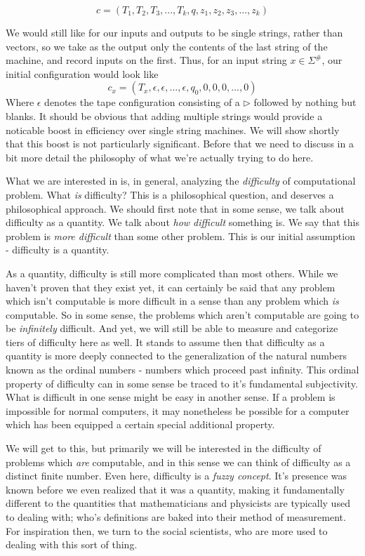 \documentclass{article}
\theoremstyle{definition}
\theoremstyle{plain}
\theoremstyle{theorem}
\begin{document}
\[c=(T_1,T_2,T_3,...,T_k,q,z_1,z_2,z_3,...,z_k) \]
\par We would still like for our inputs and outputs to be single strings, rather than vectors, so we take as the output only the contents of the last string of the machine, and record inputs on the first. Thus, for an input string $x\in \Sigma^\#$, our initial configuration would look like
\[c_x=(T_x,\epsilon, \epsilon,...,\epsilon,q_0,0,0,0,...,0) \]
Where $\epsilon$ denotes the tape configuration consisting of a $\triangleright$ followed by nothing but blanks. It should be obvious that adding multiple strings would provide a noticable boost in efficiency over single string machines. We will show shortly that this boost is not particularly significant. Before that we need to discuss in a bit more detail the philosophy of what we're actually trying to do here. 
\par What we are interested in is, in general, analyzing the \textit{difficulty} of computational problem. What \textit{is} difficulty? This is a philosophical question, and deserves a philosophical approach. We should first note that in some sense, we talk about difficulty as a quantity. We talk about \textit{how difficult} something is. We say that this problem is \textit{more difficult} than some other problem. This is our initial assumption - difficulty is a quantity.
\par As a quantity, difficulty is still more complicated than most others. While we haven't proven that they exist yet, it can certainly be said that any problem which isn't computable is more difficult in a sense than any problem which \textit{is} computable. So in some sense, the problems which aren't computable are going to be \textit{infinitely} difficult. And yet, we will still be able to measure and categorize tiers of difficulty here as well. It stands to assume then that difficulty as a quantity is more deeply connected to the generalization of the natural numbers known as the ordinal numbers - numbers which proceed past infinity. This ordinal property of difficulty can in some sense be traced to it's fundamental subjectivity. What is difficult in one sense might be easy in another sense. If a problem is impossible for normal computers, it may nonetheless be possible for a computer which has been equipped a certain special additional property. 
\par We will get to this, but primarily we will be interested in the difficulty of problems which \textit{are} computable, and in this sense we can think of difficulty as a distinct finite number. Even here, difficulty is a \textit{fuzzy concept}. It's presence was known before we even realized that it was a quantity, making it fundamentally different to the quantities that mathematicians and physicists are typically used to dealing with; who's definitions are baked into their method of measurement. For inspiration then, we turn to the social scientists, who are more used to dealing with this sort of thing. \par 
\end{document}
